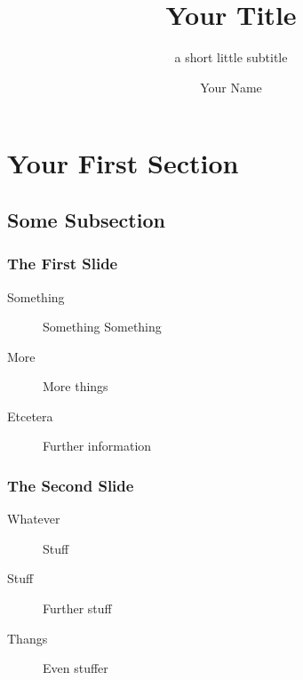 \documentclass[t,compress,aspectratio=169]{beamer}
\title{Your Title}
\subtitle{a short little subtitle}
\author{Your Name}
\begin{document}
\begin{withoutheadline}
\begin{withoutfootline}
\begin{frame}
\titlepage
\end{frame}
\end{withoutfootline}
\end{withoutheadline}

\section{Your First Section}

\subsection{Some Subsection}

\begin{frame}
    \frametitle{The First Slide}
    \begin{description}
        \item[Something] Something Something
        \pause
        \item[More] More things
        \pause
        \item[Etcetera] Further information
    \end{description}
\end{frame}

\begin{frame}
    \frametitle{The Second Slide}
    \begin{description}
        \item[Whatever] Stuff
        \pause
        \item[Stuff] Further stuff
        \pause
        \item[Thangs] Even stuffer
    \end{description}
\end{frame}
\end{document}
